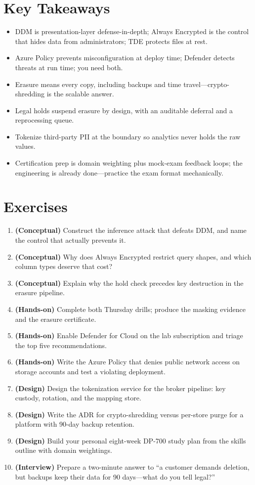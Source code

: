 \section*{Key Takeaways}
\begin{itemize}
    \item DDM is presentation-layer defense-in-depth; Always Encrypted is the control that hides data from administrators; TDE protects files at rest.
    \item Azure Policy prevents misconfiguration at deploy time; Defender detects threats at run time; you need both.
    \item Erasure means every copy, including backups and time travel---crypto-shredding is the scalable answer.
    \item Legal holds suspend erasure by design, with an auditable deferral and a reprocessing queue.
    \item Tokenize third-party PII at the boundary so analytics never holds the raw values.
    \item Certification prep is domain weighting plus mock-exam feedback loops; the engineering is already done---practice the exam format mechanically.
\end{itemize}

\section{Exercises}
\begin{enumerate}
    \item \textbf{(Conceptual)} Construct the inference attack that defeats DDM, and name the control that actually prevents it.
    \item \textbf{(Conceptual)} Why does Always Encrypted restrict query shapes, and which column types deserve that cost?
    \item \textbf{(Conceptual)} Explain why the hold check precedes key destruction in the erasure pipeline.
    \item \textbf{(Hands-on)} Complete both Thursday drills; produce the masking evidence and the erasure certificate.
    \item \textbf{(Hands-on)} Enable Defender for Cloud on the lab subscription and triage the top five recommendations.
    \item \textbf{(Hands-on)} Write the Azure Policy that denies public network access on storage accounts and test a violating deployment.
    \item \textbf{(Design)} Design the tokenization service for the broker pipeline: key custody, rotation, and the mapping store.
    \item \textbf{(Design)} Write the ADR for crypto-shredding versus per-store purge for a platform with 90-day backup retention.
    \item \textbf{(Design)} Build your personal eight-week DP-700 study plan from the skills outline with domain weightings.
    \item \textbf{(Interview)} Prepare a two-minute answer to ``a customer demands deletion, but backups keep their data for 90 days---what do you tell legal?''
\end{enumerate}

